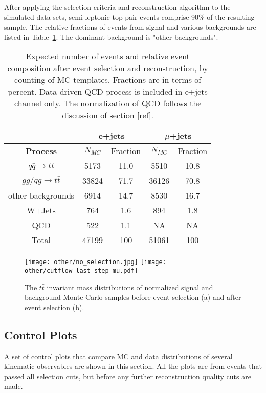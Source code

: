\documentclass{cmspaperpdf}
\begin{document}
After applying the selection criteria and reconstruction algorithm to the simulated data sets, semi-leptonic top pair events comprise 90\% of the resulting sample. The relative fractions of events from signal and various backgrounds are listed in Table~\ref{tab:mc_fractions}. The dominant background is "other backgrounds". 

\begin{table}[h!]
\small
\centering
\begin{tabular}{|c | c  c | c  c|}
\hline
 & \multicolumn{2}{|c|}{e+jets}&\multicolumn{2}{|c|}{$\mu$+jets} \\
\hline
\textbf{Process} & $N_{MC}$ & Fraction & $N_{MC}$ & Fraction \\
\hline
$q\bar{q}\rightarrow t\bar{t}$ & 5173 & 11.0 & 5510 & 10.8 \\
$gg/qg\rightarrow t\bar{t}$ & 33824 & 71.7 & 36126 & 70.8 \\ 
other backgrounds & 6914 & 14.7 & 8530 & 16.7 \\ 
W+Jets & 764 & 1.6 & 894 & 1.8 \\
QCD &522 & 1.1 & NA & NA \\
Total & 47199 & 100 & 51061 & 100 \\
\hline
\end{tabular}
\caption{\small Expected number of events and relative event composition after event selection and reconstruction, by counting of MC templates. Fractions are in terms of percent. Data driven QCD process is included in e+jets channel only. The normalization of QCD follows the discussion of section [ref]. }
\label{tab:mc_fractions}

\end{table}

\begin{figure}[h!]
\texttt{[image: other/no\_selection.jpg]}
\texttt{[image: other/cutflow\_last\_step\_mu.pdf]}
\centering
\caption{\small \small The $t\bar{t}$ invariant mass distributions of normalized signal and background Monte Carlo samples before event selection (a) and after event selection (b). }
\label{tagging_results}
\end{figure}

\subsection{Control Plots}
A set of control plots that compare MC and data distributions of several kinematic observables are shown in this section. All the plots are from events that passed all selection cuts, but before any further reconstruction quality cuts are made. 
\end{document}
